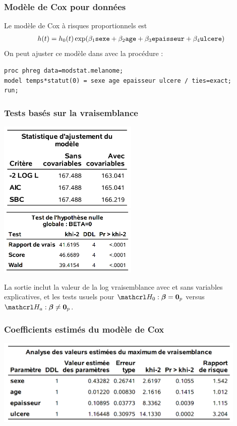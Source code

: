 \documentclass{beamer}
\begin{document}
\begin{frame}[fragile]
\frametitle{Modèle de Cox pour données }
 Le modèle de Cox à risques proportionnels est 
\begin{align*}
h(t) = h_0(t) \exp( \beta_1 \texttt{sexe} + \beta_2 \texttt{age} + \beta_3 \texttt{epaisseur} + \beta_4 \texttt{ulcere})
\end{align*}
 On peut ajuster ce modèle dans \SASlang{} avec la procédure :
\vp \vp
\begin{tcolorbox}[colback=white,colframe=hecblue,title=Code \SASlang{} pour le modèle à risque proportionnel]
{\footnotesize 
\begin{verbatim}
proc phreg data=modstat.melanome;
model temps*statut(0) = sexe age epaisseur ulcere / ties=exact;
run;
\end{verbatim}
}
\end{tcolorbox}
\end{frame}

\begin{frame}
\frametitle{Tests basés sur la vraisemblance}
\vp \vp
\begin{center}
\includegraphics[width = 0.5\textwidth]{img/c7/diapos7e12}
\includegraphics[width = 0.5\textwidth]{img/c7/diapos7e13}
\end{center}
{\footnotesize
La sortie inclut la valeur de la log vraisemblance avec et sans variables explicatives, et les tests usuels pour $\Hy_0: \bs{\beta}=\bs{0}_p$ versus $\Hy_a: \bs{\beta} \neq \bs{0}_p$.

}
\end{frame}

\begin{frame}
\frametitle{Coefficients estimés du modèle de Cox}
\vp \vp
\begin{center}
\includegraphics[width = 0.9\textwidth]{img/c7/diapos7e14}
\end{center}
% 

\end{frame}
\end{document}
